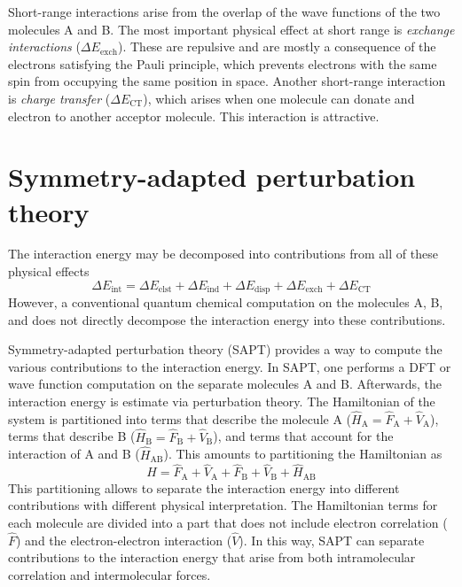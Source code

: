 \documentclass[../Main/chem371-notes.tex]{subfiles}
\begin{document}
Short-range interactions arise from the overlap of the wave functions of the two molecules A and B.
The most important physical effect at short range is \emph{exchange interactions} ($\Delta E_\text{exch}$).
These are repulsive and are mostly a consequence of the electrons satisfying the Pauli principle, which prevents electrons with the same spin from occupying the same position in space.
Another short-range interaction is \emph{charge transfer} ($\Delta E_\text{CT}$), which arises when one molecule can donate and electron to another acceptor molecule.
This interaction is attractive.

\section{Symmetry-adapted perturbation theory}

The interaction energy may be decomposed into contributions from all of these physical effects
\begin{equation}
\Delta E_\text{int} = \Delta E_\text{elst} + \Delta E_\text{ind} + \Delta E_\text{disp} + \Delta E_\text{exch}+ \Delta E_\text{CT}
\end{equation}
However, a conventional quantum chemical computation on the molecules A, B, and  does not directly decompose the interaction energy into these contributions.

Symmetry-adapted perturbation theory (SAPT) provides a way to compute the various contributions to the interaction energy.
In SAPT, one performs a DFT or wave function computation on the separate molecules A and B.
Afterwards, the interaction energy is estimate via perturbation theory.
The Hamiltonian of the   system is partitioned into terms that describe the molecule A ($\hat{H}_\mathrm{A} = \hat{F}_\mathrm{A} + \hat{V}_\mathrm{A} $), terms that describe B ($\hat{H}_\mathrm{B} =  \hat{F}_\mathrm{B} + \hat{V}_\mathrm{B}$), and terms that account for the interaction of A and B ($\hat{H}_\mathrm{AB}$).
This amounts to partitioning the Hamiltonian as
\begin{equation}
\hat{H} = \hat{F}_\mathrm{A} + \hat{V}_\mathrm{A} + \hat{F}_\mathrm{B} + \hat{V}_\mathrm{B} + \hat{H}_\mathrm{AB}
\end{equation}
This partitioning allows to separate the interaction energy into different contributions with different physical interpretation.
The Hamiltonian terms for each molecule are divided into a part that does not include electron correlation ($\hat{F}$) and the electron-electron interaction ($\hat{V}$).
In this way, SAPT can separate contributions to the interaction energy that arise from both intramolecular correlation and intermolecular forces.
\end{document}
